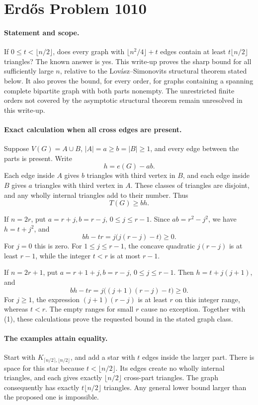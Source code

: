 \section*{Erd\H{o}s Problem 1010}

\paragraph{Statement and scope.}
If \(0\leq t<\lfloor n/2\rfloor\), does every graph with \(\lfloor n^2/4\rfloor+t\) edges contain at least \(t\lfloor n/2\rfloor\) triangles? The known answer is yes. This write-up proves the sharp bound for all sufficiently large \(n\), relative to the Lov\'asz--Simonovits structural theorem stated below. It also proves the bound, for every order, for graphs containing a spanning complete bipartite graph with both parts nonempty. The unrestricted finite orders not covered by the asymptotic structural theorem remain unresolved in this write-up.

\paragraph{Exact calculation when all cross edges are present.}
Suppose \(V(G)=A\cup B\), \(|A|=a\geq b=|B|\geq1\), and every edge between the parts is present. Write
\[
 h=e(G)-ab.
\]
Each edge inside \(A\) gives \(b\) triangles with third vertex in \(B\), and each edge inside \(B\) gives \(a\) triangles with third vertex in \(A\). These classes of triangles are disjoint, and any wholly internal triangles add to their number. Thus
\[
 T(G)\geq b h.
\tag{1}
\]

If \(n=2r\), put \(a=r+j,b=r-j\), \(0\leq j\leq r-1\). Since \(ab=r^2-j^2\), we have \(h=t+j^2\), and
\[
 b h-tr=j\bigl(j(r-j)-t\bigr)\geq0.
\]
For \(j=0\) this is zero. For \(1\leq j\leq r-1\), the concave quadratic \(j(r-j)\) is at least \(r-1\), while the integer \(t<r\) is at most \(r-1\).

If \(n=2r+1\), put \(a=r+1+j,b=r-j\), \(0\leq j\leq r-1\). Then \(h=t+j(j+1)\), and
\[
 b h-tr=j\bigl((j+1)(r-j)-t\bigr)\geq0.
\]
For \(j\geq1\), the expression \((j+1)(r-j)\) is at least \(r\) on this integer range, whereas \(t<r\). The empty ranges for small \(r\) cause no exception. Together with (1), these calculations prove the requested bound in the stated graph class.

\paragraph{The examples attain equality.}
Start with \(K_{\lceil n/2\rceil,\lfloor n/2\rfloor}\), and add a star with \(t\) edges inside the larger part. There is space for this star because \(t<\lfloor n/2\rfloor\). Its edges create no wholly internal triangles, and each gives exactly \(\lfloor n/2\rfloor\) cross-part triangles. The graph consequently has exactly \(t\lfloor n/2\rfloor\) triangles. Any general lower bound larger than the proposed one is impossible.

